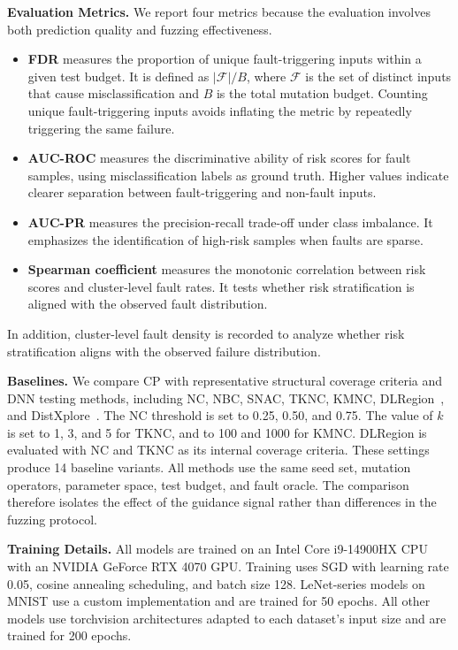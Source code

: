 \documentclass[preprint,number,5p,twocolumn]{elsarticle}
\begin{document}
\textbf{Evaluation Metrics.} We report four metrics because the evaluation involves both prediction quality and fuzzing effectiveness.

\begin{itemize}
\item \textbf{FDR} measures the proportion of unique fault-triggering inputs within a given test budget. It is defined as $|\mathcal{F}|/B$, where $\mathcal{F}$ is the set of distinct inputs that cause misclassification and $B$ is the total mutation budget. Counting unique fault-triggering inputs avoids inflating the metric by repeatedly triggering the same failure.

\item \textbf{AUC-ROC} measures the discriminative ability of risk scores for fault samples, using misclassification labels as ground truth. Higher values indicate clearer separation between fault-triggering and non-fault inputs.

\item \textbf{AUC-PR} measures the precision-recall trade-off under class imbalance. It emphasizes the identification of high-risk samples when faults are sparse.

\item \textbf{Spearman coefficient} measures the monotonic correlation between risk scores and cluster-level fault rates. It tests whether risk stratification is aligned with the observed fault distribution.
\end{itemize}

In addition, cluster-level fault density is recorded to analyze whether risk stratification aligns with the observed failure distribution.

\textbf{Baselines.} We compare CP with representative structural coverage criteria and DNN testing methods, including NC, NBC, SNAC, TKNC, KMNC, DLRegion~\cite{TaoTGH023}, and DistXplore~\cite{distxplore}. The NC threshold is set to 0.25, 0.50, and 0.75. The value of $k$ is set to 1, 3, and 5 for TKNC, and to 100 and 1000 for KMNC. DLRegion is evaluated with NC and TKNC as its internal coverage criteria. These settings produce 14 baseline variants. All methods use the same seed set, mutation operators, parameter space, test budget, and fault oracle. The comparison therefore isolates the effect of the guidance signal rather than differences in the fuzzing protocol.

\textbf{Training Details.} All models are trained on an Intel Core i9-14900HX CPU with an NVIDIA GeForce RTX 4070 GPU. Training uses SGD with learning rate 0.05, cosine annealing scheduling, and batch size 128. LeNet-series models on MNIST use a custom implementation and are trained for 50 epochs. All other models use torchvision architectures adapted to each dataset's input size and are trained for 200 epochs.
\end{document}
